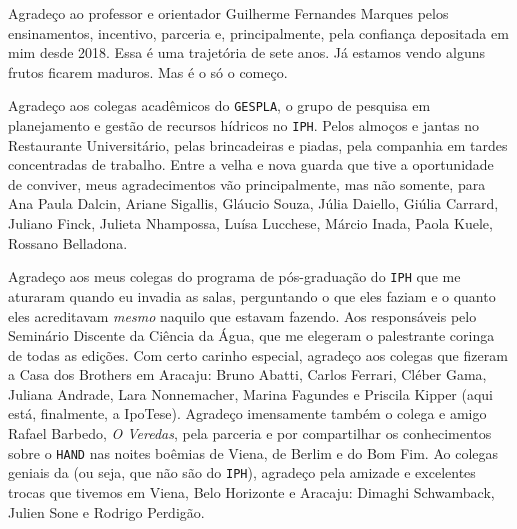 \documentclass[./main.tex]{subfiles}
\begin{document}
\doublespacing %
\large

\newpage
\renewcommand{\headrulewidth}{0pt}
\thispagestyle{fancy}
\fancyhf{} %
\fancyfoot{} %
\fancyfoot[C]{\thepage}

\begin{center}
    \vspace{5mm}
\end{center}
\singlespacing
\normalsize

\setlength{\parskip}{\myparskip}

\par Agradeço ao professor e orientador Guilherme Fernandes Marques pelos ensinamentos, incentivo, parceria e, principalmente, pela confiança depositada em mim desde 2018. Essa é uma trajetória de sete anos. Já estamos vendo alguns frutos ficarem maduros. Mas é o só o começo.

\par Agradeço aos colegas acadêmicos do \texttt{GESPLA}, o grupo de pesquisa em planejamento e gestão de recursos hídricos no \texttt{IPH}. Pelos almoços e jantas no Restaurante Universitário, pelas brincadeiras e piadas, pela companhia em tardes concentradas de trabalho. Entre a velha e nova guarda que tive a oportunidade de conviver, meus agradecimentos vão principalmente, mas não somente, para Ana Paula Dalcin, Ariane Sigallis, Gláucio Souza, Júlia Daiello, Giúlia Carrard, Juliano Finck, Julieta Nhampossa, Luísa Lucchese, Márcio Inada, Paola Kuele, Rossano Belladona.

\par Agradeço aos meus colegas do programa de pós-graduação do \texttt{IPH} que me aturaram quando eu invadia as salas, perguntando o que eles faziam e o quanto eles acreditavam \textit{mesmo} naquilo que estavam fazendo. Aos responsáveis pelo Seminário Discente da Ciência da Água, que me elegeram o palestrante coringa de todas as edições. Com certo carinho especial, agradeço aos colegas que fizeram a Casa dos Brothers em Aracaju: Bruno Abatti, Carlos Ferrari, Cléber Gama, Juliana Andrade, Lara Nonnemacher, Marina Fagundes e Priscila Kipper (aqui está, finalmente, a IpoTese). Agradeço imensamente também o colega e amigo Rafael Barbedo, \textit{O Veredas}, pela parceria e por compartilhar os conhecimentos sobre o \texttt{HAND} nas noites boêmias de Viena, de Berlim e do Bom Fim. Ao colegas geniais da  (ou seja, que não são do \texttt{IPH}), agradeço pela amizade e excelentes trocas que tivemos em Viena, Belo Horizonte e Aracaju: Dimaghi Schwamback, Julien Sone e Rodrigo Perdigão.
\end{document}
